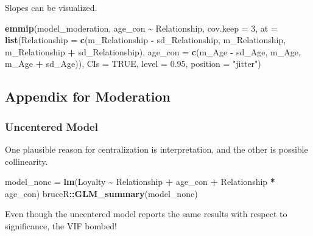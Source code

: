 \documentclass[
]{ctexart}
\newenvironment{Shaded}{\begin{snugshade}}{\end{snugshade}}
\newcommand{\AttributeTok}[1]{\textcolor[rgb]{0.13,0.29,0.53}{#1}}
\newcommand{\ConstantTok}[1]{\textcolor[rgb]{0.56,0.35,0.01}{#1}}
\newcommand{\DecValTok}[1]{\textcolor[rgb]{0.00,0.00,0.81}{#1}}
\newcommand{\FloatTok}[1]{\textcolor[rgb]{0.00,0.00,0.81}{#1}}
\newcommand{\FunctionTok}[1]{\textcolor[rgb]{0.13,0.29,0.53}{\textbf{#1}}}
\newcommand{\NormalTok}[1]{#1}
\newcommand{\OtherTok}[1]{\textcolor[rgb]{0.56,0.35,0.01}{#1}}
\newcommand{\SpecialCharTok}[1]{\textcolor[rgb]{0.81,0.36,0.00}{\textbf{#1}}}
\newcommand{\StringTok}[1]{\textcolor[rgb]{0.31,0.60,0.02}{#1}}
\begin{document}
Slopes can be visualized.

\begin{Shaded}
\begin{Highlighting}[]
\FunctionTok{emmip}\NormalTok{(model\_moderation, age\_con }\SpecialCharTok{\textasciitilde{}}\NormalTok{ Relationship, }\AttributeTok{cov.keep =} \DecValTok{3}\NormalTok{, }\AttributeTok{at =} \FunctionTok{list}\NormalTok{(}\AttributeTok{Relationship =} \FunctionTok{c}\NormalTok{(m\_Relationship }\SpecialCharTok{{-}}
\NormalTok{    sd\_Relationship, m\_Relationship, m\_Relationship }\SpecialCharTok{+}\NormalTok{ sd\_Relationship), }\AttributeTok{age\_con =} \FunctionTok{c}\NormalTok{(m\_Age }\SpecialCharTok{{-}}
\NormalTok{    sd\_Age, m\_Age, m\_Age }\SpecialCharTok{+}\NormalTok{ sd\_Age)), }\AttributeTok{CIs =} \ConstantTok{TRUE}\NormalTok{, }\AttributeTok{level =} \FloatTok{0.95}\NormalTok{, }\AttributeTok{position =} \StringTok{"jitter"}\NormalTok{)}
\end{Highlighting}
\end{Shaded}

\hypertarget{appendix-for-moderation}{%
\subsection{Appendix for Moderation}\label{appendix-for-moderation}}

\hypertarget{uncentered-model}{%
\subsubsection{Uncentered Model}\label{uncentered-model}}

One plausible reason for centralization is interpretation, and the other
is possible collinearity.

\begin{Shaded}
\begin{Highlighting}[]
\NormalTok{model\_nonc }\OtherTok{=} \FunctionTok{lm}\NormalTok{(Loyalty }\SpecialCharTok{\textasciitilde{}}\NormalTok{ Relationship }\SpecialCharTok{+}\NormalTok{ age\_con }\SpecialCharTok{+}\NormalTok{ Relationship }\SpecialCharTok{*}\NormalTok{ age\_con)}
\NormalTok{bruceR}\SpecialCharTok{::}\FunctionTok{GLM\_summary}\NormalTok{(model\_nonc)}
\end{Highlighting}
\end{Shaded}

Even though the uncentered model reports the same results with respect
to significance, the VIF bombed!
\end{document}
